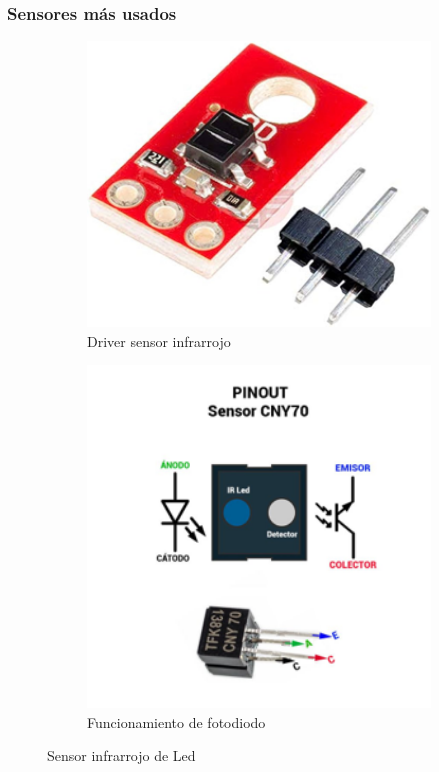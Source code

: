 \documentclass[a4paper,11pt]{report}    %
\begin{document}
\subsubsection{Sensores más usados}
\begin{figure}[H]
    \begin{subfigure}[t]{0.475\textwidth}
        \includegraphics[width=1\textwidth]{img/image12.png}
        \caption{Driver sensor infrarrojo}
        \label{subfig:example-image-b}
    \end{subfigure}%
    \hfill
    \begin{subfigure}[t]{0.475\textwidth}
        \includegraphics[width=1\textwidth]{img/image13.png}
        \caption{Funcionamiento de fotodiodo}
        \label{subfig:example-image-c}
    \end{subfigure}
    \caption{Sensor infrarrojo de Led}
    \label{fig:test_subfigure}
\end{figure}
\end{document}
